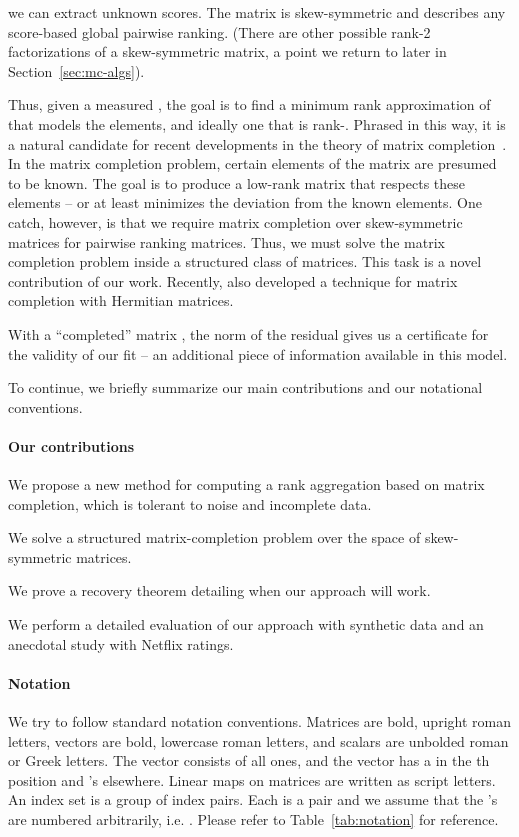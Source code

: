 \documentclass{sig-alternate}
\renewcommand{\cite}{\citep}
\begin{document}
we can extract unknown scores.  The matrix 
is  skew-symmetric and describes any score-based global pairwise
ranking.  (There are other possible rank-2 factorizations
of a skew-symmetric matrix, 
a point we return to later in Section~\ref{sec:mc-algs}).



Thus, given a measured , the goal is to find
a minimum rank approximation of  that models the elements, and ideally
one that is rank-.  Phrased
in this way, it is a natural candidate for recent developments in the
theory of matrix completion~\cite{candes2009-matrix-completion,recht2009-nuclear-norm}.
In the matrix
 completion problem, certain elements of the matrix are presumed to be known.
 The goal is to produce a low-rank matrix that respects these elements -- or at
  least minimizes the deviation from the known elements.  One catch, 
 however, is that we require
 matrix completion over skew-symmetric matrices for pairwise
ranking matrices.  Thus, we must
solve the matrix completion problem inside a structured class of 
matrices.  This task is a novel contribution of our work.
Recently, \citet{Gross2010-low-rank} also developed a technique
for matrix completion with Hermitian matrices.

With a ``completed'' matrix , the norm of the residual 
gives us a certificate for the validity of our fit -- an additional piece of
information available in this model.

To continue, we briefly summarize our main contributions and 
our notational conventions.  

\paragraph{Our contributions}
\begin{compactitem}
 \item We propose a new method for computing a rank aggregation based on 
 matrix completion, which is tolerant to noise and incomplete data.
 \item We solve a structured matrix-completion problem
 over the space  of skew-symmetric matrices.
 \item We prove a recovery theorem detailing when our approach
 will work.
 \item We perform a detailed evaluation of our approach with
   synthetic data and an anecdotal study with Netflix ratings.
\end{compactitem}

\paragraph{Notation} We try to follow standard
notation conventions.  Matrices are bold, upright roman letters, vectors
are bold, lowercase roman letters, and scalars are unbolded roman or Greek
letters.  The vector  consists of all ones,
and the vector  has a  in the th position and 's
elsewhere.
Linear maps on matrices are written as script letters.  
An index set 
is a group of index pairs.  Each 
is a pair  and we assume that the 's are
numbered arbitrarily, i.e. .
Please refer to Table~\ref{tab:notation} for reference.
\end{document}
